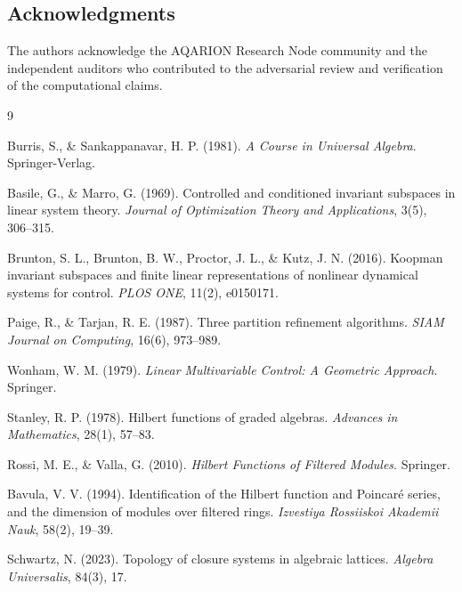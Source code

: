 \documentclass[11pt, a4paper]{article}
\theoremstyle{definition}
\theoremstyle{remark}
\begin{document}
\subsection*{Acknowledgments}

The authors acknowledge the AQARION Research Node community and the independent auditors who contributed to the adversarial review and verification of the computational claims.


\begin{thebibliography}{9}

Burris, S., \& Sankappanavar, H. P. (1981). \emph{A Course in Universal Algebra}. Springer-Verlag.

Basile, G., \& Marro, G. (1969). Controlled and conditioned invariant subspaces in linear system theory. \emph{Journal of Optimization Theory and Applications}, 3(5), 306–315.

Brunton, S. L., Brunton, B. W., Proctor, J. L., \& Kutz, J. N. (2016). Koopman invariant subspaces and finite linear representations of nonlinear dynamical systems for control. \emph{PLOS ONE}, 11(2), e0150171.

Paige, R., \& Tarjan, R. E. (1987). Three partition refinement algorithms. \emph{SIAM Journal on Computing}, 16(6), 973–989.

Wonham, W. M. (1979). \emph{Linear Multivariable Control: A Geometric Approach}. Springer.

Stanley, R. P. (1978). Hilbert functions of graded algebras. \emph{Advances in Mathematics}, 28(1), 57–83.

Rossi, M. E., \& Valla, G. (2010). \emph{Hilbert Functions of Filtered Modules}. Springer.

Bavula, V. V. (1994). Identification of the Hilbert function and Poincaré series, and the dimension of modules over filtered rings. \emph{Izvestiya Rossiiskoi Akademii Nauk}, 58(2), 19–39.

Schwartz, N. (2023). Topology of closure systems in algebraic lattices. \emph{Algebra Universalis}, 84(3), 17.

\end{thebibliography}
\end{document}
